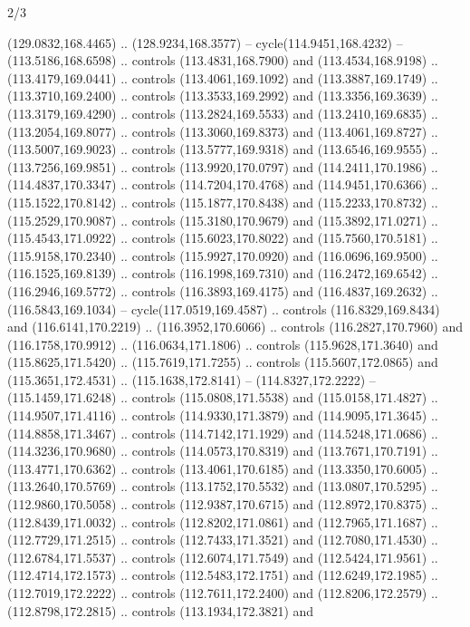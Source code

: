 \begin{flagdescription}{2/3}
\begin{scope}[shift={(0.5\flaglength,0.5)},scale=\flagwidth/320]
\begin{scope}[y=0.8pt, x=0.8pt, yscale=-1,shift={(-118.3,-146)}]
  (129.0832,168.4465) .. (128.9234,168.3577) -- cycle(114.9451,168.4232) --
  (113.5186,168.6598) .. controls (113.4831,168.7900) and (113.4534,168.9198) ..
  (113.4179,169.0441) .. controls (113.4061,169.1092) and (113.3887,169.1749) ..
  (113.3710,169.2400) .. controls (113.3533,169.2992) and (113.3356,169.3639) ..
  (113.3179,169.4290) .. controls (113.2824,169.5533) and (113.2410,169.6835) ..
  (113.2054,169.8077) .. controls (113.3060,169.8373) and (113.4061,169.8727) ..
  (113.5007,169.9023) .. controls (113.5777,169.9318) and (113.6546,169.9555) ..
  (113.7256,169.9851) .. controls (113.9920,170.0797) and (114.2411,170.1986) ..
  (114.4837,170.3347) .. controls (114.7204,170.4768) and (114.9451,170.6366) ..
  (115.1522,170.8142) .. controls (115.1877,170.8438) and (115.2233,170.8732) ..
  (115.2529,170.9087) .. controls (115.3180,170.9679) and (115.3892,171.0271) ..
  (115.4543,171.0922) .. controls (115.6023,170.8022) and (115.7560,170.5181) ..
  (115.9158,170.2340) .. controls (115.9927,170.0920) and (116.0696,169.9500) ..
  (116.1525,169.8139) .. controls (116.1998,169.7310) and (116.2472,169.6542) ..
  (116.2946,169.5772) .. controls (116.3893,169.4175) and (116.4837,169.2632) ..
  (116.5843,169.1034) -- cycle(117.0519,169.4587) .. controls
  (116.8329,169.8434) and (116.6141,170.2219) .. (116.3952,170.6066) .. controls
  (116.2827,170.7960) and (116.1758,170.9912) .. (116.0634,171.1806) .. controls
  (115.9628,171.3640) and (115.8625,171.5420) .. (115.7619,171.7255) .. controls
  (115.5607,172.0865) and (115.3651,172.4531) .. (115.1638,172.8141) --
  (114.8327,172.2222) -- (115.1459,171.6248) .. controls (115.0808,171.5538) and
  (115.0158,171.4827) .. (114.9507,171.4116) .. controls (114.9330,171.3879) and
  (114.9095,171.3645) .. (114.8858,171.3467) .. controls (114.7142,171.1929) and
  (114.5248,171.0686) .. (114.3236,170.9680) .. controls (114.0573,170.8319) and
  (113.7671,170.7191) .. (113.4771,170.6362) .. controls (113.4061,170.6185) and
  (113.3350,170.6005) .. (113.2640,170.5769) .. controls (113.1752,170.5532) and
  (113.0807,170.5295) .. (112.9860,170.5058) .. controls (112.9387,170.6715) and
  (112.8972,170.8375) .. (112.8439,171.0032) .. controls (112.8202,171.0861) and
  (112.7965,171.1687) .. (112.7729,171.2515) .. controls (112.7433,171.3521) and
  (112.7080,171.4530) .. (112.6784,171.5537) .. controls (112.6074,171.7549) and
  (112.5424,171.9561) .. (112.4714,172.1573) .. controls (112.5483,172.1751) and
  (112.6249,172.1985) .. (112.7019,172.2222) .. controls (112.7611,172.2400) and
  (112.8206,172.2579) .. (112.8798,172.2815) .. controls (113.1934,172.3821) and

\end{scope}
\end{scope}
\end{flagdescription}

